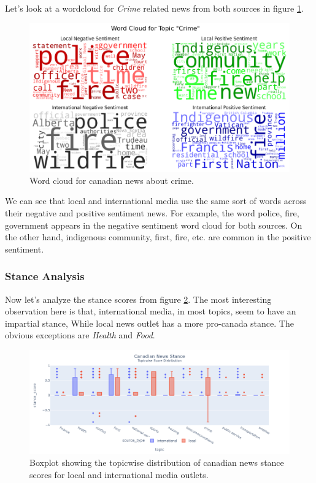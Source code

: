 \documentclass{article}
\theoremstyle{mytheoremstyle}
\theoremstyle{mytheoremstyle}
\theoremstyle{myproblemstyle}
\begin{document}
    Let's look at a wordcloud for \emph{Crime} related news from both sources in figure \ref{fig:canada_sentiment_score_wordcloud}.

    \begin{figure}[hp]
        \centering
        \includegraphics[width=\linewidth]{../images/plots/Canada/canada_wordcloud_crime.png}
        \caption{Word cloud for canadian news about crime.}
        \label{fig:canada_sentiment_score_wordcloud}
    \end{figure}

    We can see that local and international media use the same sort of words across their negative and positive sentiment news. For example, the word police, fire, government appears in the negative sentiment word cloud for both sources. On the other hand, indigenous community, first, fire, etc. are common in the positive sentiment.

    \subsubsection{Stance Analysis}

    Now let's analyze the stance scores from figure \ref{fig:canada_stance_score_boxplot}. The most interesting observation here is that, international media, in most topics, seem to have an impartial stance, While local news outlet has a more pro-canada stance. The obvious exceptions are \emph{Health} and \emph{Food}.
    
    \begin{figure}[hp]
        \centering
        \includegraphics[width=\linewidth]{../images/plots/Canada/canada_boxplot_stance.png}
        \caption{Boxplot showing the topicwise distribution of canadian news stance scores for local and international media outlets.}
        \label{fig:canada_stance_score_boxplot}
    \end{figure}
\end{document}
